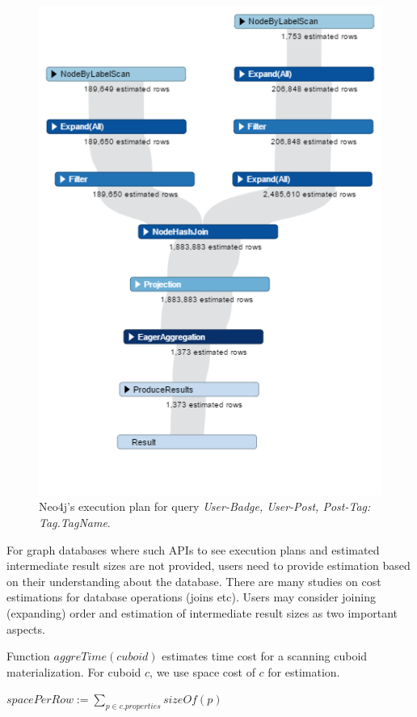 \begin {figure}[H]
\centering
\includegraphics[scale=0.6]{pic/61.png}
\caption{Neo4j's execution plan for query \textit{User-Badge, User-Post, Post-Tag: Tag.TagName}.}
\label{fig:4:2}
\end{figure}

For graph databases where such APIs to see  execution plans and estimated intermediate result sizes are not provided, users need to provide estimation based on their understanding about the database. There are many studies on cost estimations for database operations (joins etc). Users may consider joining (expanding) order \cite{DBLP:conf/pods/Chaudhuri98} and estimation of intermediate result sizes  \cite{DBLP:conf/edbt/SwamiS94} as two important aspects. 

Function \textbf{$aggreTime(cuboid)$} estimates time cost for a scanning cuboid materialization. For cuboid $c$, we use space cost of $c$ for estimation. 

$spacePerRow:= 
\displaystyle{\sum_{p\in c.properties}sizeOf(p)}$

